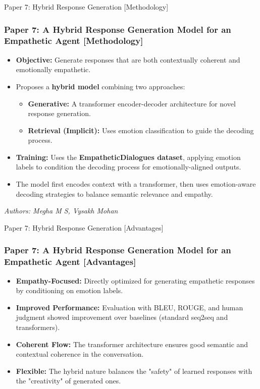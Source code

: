 \documentclass[11pt]{beamer}
\begin{document}
\begin{frame}{Paper 7: Hybrid Response Generation [Methodology]}
\frametitle{Paper 7: A Hybrid Response Generation Model for an Empathetic Agent [Methodology]}
\begin{itemize}
    \item \textbf{Objective:} Generate responses that are both contextually coherent and emotionally empathetic.
    \item Proposes a \textbf{hybrid model} combining two approaches:
    \begin{itemize}
        \item \textbf{Generative:} A transformer encoder-decoder architecture for novel response generation.
        \item \textbf{Retrieval (Implicit):} Uses emotion classification to guide the decoding process.
    \end{itemize}
    \item \textbf{Training:} Uses the \textbf{EmpatheticDialogues dataset}, applying emotion labels to condition the decoding process for emotionally-aligned outputs.
    \item The model first encodes context with a transformer, then uses emotion-aware decoding strategies to balance semantic relevance and empathy.
\end{itemize}
\vfill
\small{\textit{Authors: Megha M S, Vysakh Mohan}}
\end{frame}

\begin{frame}{Paper 7: Hybrid Response Generation [Advantages]}
\frametitle{Paper 7: A Hybrid Response Generation Model for an Empathetic Agent [Advantages]}
\begin{itemize}
    \item \textbf{Empathy-Focused:} Directly optimized for generating empathetic responses by conditioning on emotion labels.
    \item \textbf{Improved Performance:} Evaluation with BLEU, ROUGE, and human judgment showed improvement over baselines (standard seq2seq and transformers).
    \item \textbf{Coherent Flow:} The transformer architecture ensures good semantic and contextual coherence in the conversation.
    \item \textbf{Flexible:} The hybrid nature balances the "safety" of learned responses with the "creativity" of generated ones.
\end{itemize}
\end{frame}
\end{document}
